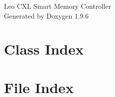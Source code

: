 \documentclass[twoside]{book}
\newcommand{\+}{\discretionary{\mbox{\scriptsize$\hookleftarrow$}}{}{}}
\newcommand{\clearemptydoublepage}{%
    \newpage{\pagestyle{empty}\cleardoublepage}%
  }
\begin{document}
  \raggedbottom
    \hypersetup{pageanchor=false,
                bookmarksnumbered=true,
                pdfencoding=unicode
               }
  \begin{titlepage}
  \vspace*{7cm}
  \begin{center}%
  {\Large Leo CXL Smart Memory Controller}\\
  \vspace*{1cm}
  {\large Generated by Doxygen 1.9.6}\\
  \end{center}
  \end{titlepage}
  \clearemptydoublepage
  \tableofcontents
  \clearemptydoublepage
  \hypersetup{pageanchor=true}
\chapter{Class Index}

\chapter{File Index}

\end{document}

